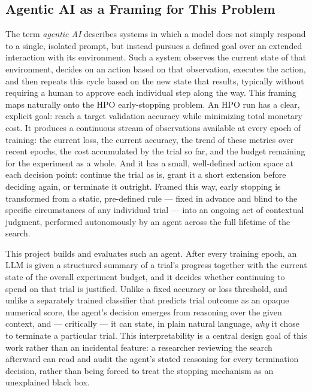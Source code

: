 \documentclass[11pt]{article}
\begin{document}
\subsection{Agentic AI as a Framing for This Problem}

The term \emph{agentic AI} describes systems in which a model does not simply respond to a single, isolated prompt, but instead pursues a defined goal over an extended interaction with its environment. Such a system observes the current state of that environment, decides on an action based on that observation, executes the action, and then repeats this cycle based on the new state that results, typically without requiring a human to approve each individual step along the way. This framing maps naturally onto the HPO early-stopping problem. An HPO run has a clear, explicit goal: reach a target validation accuracy while minimizing total monetary cost. It produces a continuous stream of observations available at every epoch of training: the current loss, the current accuracy, the trend of these metrics over recent epochs, the cost accumulated by the trial so far, and the budget remaining for the experiment as a whole. And it has a small, well-defined action space at each decision point: continue the trial as is, grant it a short extension before deciding again, or terminate it outright. Framed this way, early stopping is transformed from a static, pre-defined rule --- fixed in advance and blind to the specific circumstances of any individual trial --- into an ongoing act of contextual judgment, performed autonomously by an agent across the full lifetime of the search.

This project builds and evaluates such an agent. After every training epoch, an LLM is given a structured summary of a trial's progress together with the current state of the overall experiment budget, and it decides whether continuing to spend on that trial is justified. Unlike a fixed accuracy or loss threshold, and unlike a separately trained classifier that predicts trial outcome as an opaque numerical score, the agent's decision emerges from reasoning over the given context, and --- critically --- it can state, in plain natural language, \emph{why} it chose to terminate a particular trial. This interpretability is a central design goal of this work rather than an incidental feature: a researcher reviewing the search afterward can read and audit the agent's stated reasoning for every termination decision, rather than being forced to treat the stopping mechanism as an unexplained black box.
\end{document}
